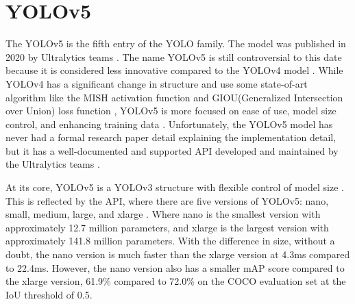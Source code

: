 \section{YOLOv5}  \label{sec:yolov5}

The YOLOv5 is the fifth entry of the YOLO family. The model was published in 2020 by Ultralytics teams \cite{yolov5_github}. The name YOLOv5 is still controversial to this date because it is considered less innovative compared to the YOLOv4 model \cite{yolov5_review}. While YOLOv4 has a significant change in structure and use some state-of-art algorithm like the MISH activation function and GIOU(Generalized Intersection over Union) loss function \cite{yolov4_2020}, YOLOv5 is more focused on ease of use, model size control, and enhancing training data \cite{yolov5_review}. Unfortunately, the YOLOv5 model has never had a formal research paper detail explaining the implementation detail, but it has a well-documented and supported API developed and maintained by the Ultralytics teams \cite{yolov5_github}. 

At its core, YOLOv5 is a YOLOv3 structure with flexible control of model size \cite{yolov5_review}. This is reflected by the API, where there are five versions of YOLOv5: nano, small, medium, large, and xlarge  \cite{pytorch_yolov5}. Where nano is the smallest version with approximately 12.7 million parameters, and xlarge is the largest version with approximately 141.8 million parameters. With the difference in size, without a doubt, the nano version is much faster than the xlarge version at 4.3ms compared to 22.4ms. However, the nano version also has a smaller mAP score compared to the xlarge version, 61.9\% compared to 72.0\% on the COCO evaluation set at the IoU threshold of 0.5.